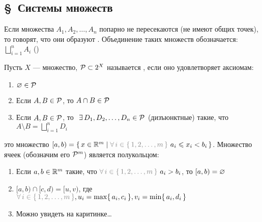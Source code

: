 \subsection*{\S\ Системы множеств}

\begin{opr}
	 Если множества $A_1, A_2, \ldots, A_n$ попарно не пересекаются (не имеют общих точек), то говорят, что они образуют . Объединение таких множеств обозначается: $\bigsqcup\limits_{i = 1}^n A_i$ ()
\end{opr}

\begin{opr}
	Пусть $X$ --- множество, $\mathcal{P} \subset 2^X$ называется  , если оно удовлетворяет аксиомам:
	\begin{enumerate}
		\item $\varnothing \in \mathcal{P}$
		
		\item\label{акс.2 полук.} Если $A, B \in \mathcal{P}$, то $A \cap B \in \mathcal{P}$
		
		\item\label{акс.3 полук.} Если $A, B \in \mathcal{P}$, то$\E D_1, D_2, \ldots, D_n \in \p$ (дизъюнктные) такие, что $A \setminus B = \bigsqcup\limits_{i = 1}^n D_i$
	\end{enumerate}
\end{opr}\vspace{-10pt}

\begin{opr}
	 это множество $[a, b) = \{\, x \in \rmm \mid \uns{\small\A i \in \{\,1, 2, \ldots, m\,\}}\ a_i \< x_i < b_i \,\}$. Множество ячеек (обозначим его $\mathcal{P}^m$) является полукольцом:
	\begin{enumerate}
		\item Если $a, b \in \mathbb R^m$ такие, что $\uns{\small\A i \in \{\,1, 2, \ldots, m\,\}}\ a_i > b_i$, то $[a,b) = \varnothing$
		
		\item $[a, b) \cap [c, d) = [u, v)$, где $\uns{\small\A i \in \{\,1, 2, \ldots, m\,\}}, u_i = \max\{\,a_i, c_i\,\}, v_i = \min\{\,a_i, d_i\,\}$
		
		\item Можно увидеть на каритинке\dots
	\end{enumerate}
\end{opr}

